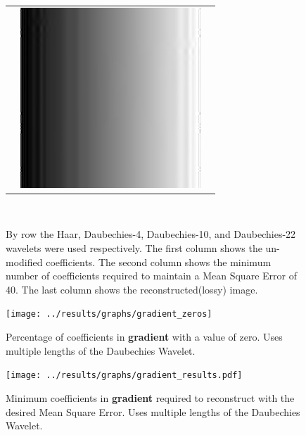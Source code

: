 \begin{figure}[hbt]
\begin{tabular}{ S @{} S @{} S }
		&	\includegraphics[height=0.25\textwidth]{../images/gradient_d22_final} \\
	\end{tabular} \\
	\caption{By row the Haar, Daubechies-4, Daubechies-10, and Daubechies-22 wavelets were used 
					 respectively. The first
					 column shows the un-modified coefficients.  The second column shows the minimum number
					 of coefficients required to maintain a Mean Square Error of 40.
					 The last column shows the reconstructed(lossy) image.}
\end{figure}

\begin{figure}[hbt]
	\centering
	\label{fig:gradient_zeros}
		\texttt{[image: ../results/graphs/gradient\_zeros]}
	\caption{Percentage of coefficients in {\bf gradient} with a value of zero. Uses multiple lengths of the Daubechies Wavelet. }
\end{figure}
\begin{figure}[hbt]
	\centering
	\label{fig:gradient_stats}
		\texttt{[image: ../results/graphs/gradient\_results.pdf]}
	\caption{Minimum coefficients in {\bf gradient} required to reconstruct with the desired Mean Square Error. Uses multiple lengths of the Daubechies Wavelet. }
\end{figure}

